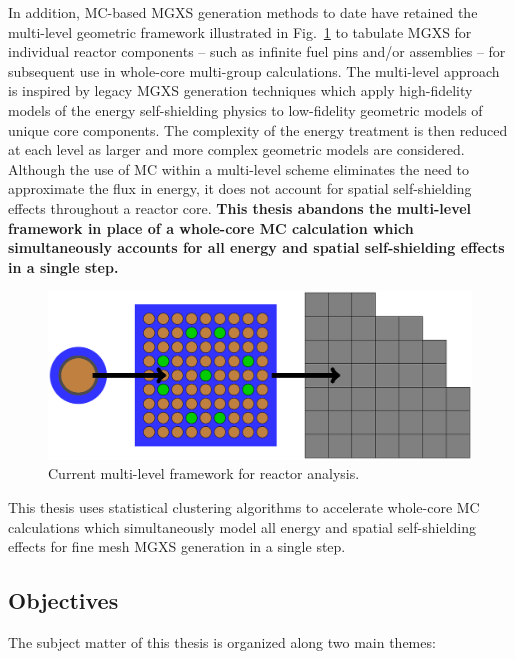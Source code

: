 \documentclass[12pt,twoside]{mitthesis-exec}
\begin{document}
In addition, MC-based MGXS generation methods to date have retained the multi-level geometric framework illustrated in Fig.~\ref{fig:multi-level-flow-chart} to tabulate MGXS for individual reactor components -- such as infinite fuel pins and/or assemblies -- for subsequent use in whole-core multi-group calculations. The multi-level approach is inspired by legacy MGXS generation techniques which apply high-fidelity models of the energy self-shielding physics to low-fidelity geometric models of unique core components. The complexity of the energy treatment is then reduced at each level as larger and more complex geometric models are considered. Although the use of MC within a multi-level scheme eliminates the need to approximate the flux in energy, it does not account for spatial self-shielding effects throughout a reactor core. \textbf{This thesis abandons the multi-level framework in place of a whole-core MC calculation which simultaneously accounts for all energy and spatial self-shielding effects in a single step.}

\begin{figure}[h!]
\centering
\includegraphics[width=0.9\linewidth]{figures/intro/multi-step-flow-chart}
\caption[Multi-level approach to reactor analysis]{Current multi-level framework for reactor analysis.}
\label{fig:multi-level-flow-chart}
\end{figure}

This thesis uses statistical clustering algorithms to accelerate whole-core MC calculations
which simultaneously model all energy and spatial self-shielding effects for fine mesh MGXS generation in a single step.

\clearpage

\subsection*{Objectives}

The subject matter of this thesis is organized along two main themes:
\end{document}
